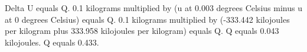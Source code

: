 Delta U equals Q.  
0.1 kilograms multiplied by (u at 0.003 degrees Celsius minus u at 0 degrees Celsius) equals Q.  
0.1 kilograms multiplied by (-333.442 kilojoules per kilogram plus 333.958 kilojoules per kilogram) equals Q.  
Q equals 0.043 kilojoules.  
Q equals 0.433.